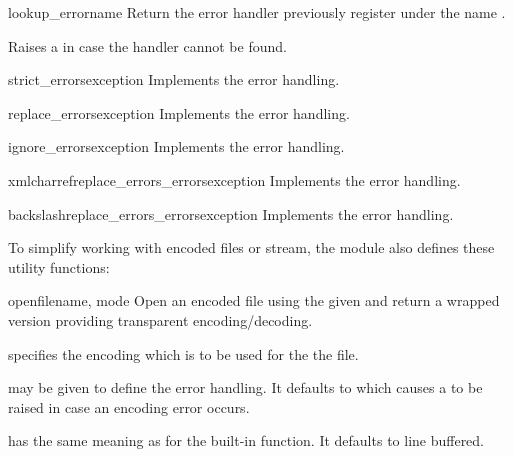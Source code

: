 \begin{funcdesc}{lookup_error}{name}
Return the error handler previously register under the name .

Raises a  in case the handler cannot be found.
\end{funcdesc}

\begin{funcdesc}{strict_errors}{exception}
Implements the  error handling.
\end{funcdesc}

\begin{funcdesc}{replace_errors}{exception}
Implements the  error handling.
\end{funcdesc}

\begin{funcdesc}{ignore_errors}{exception}
Implements the  error handling.
\end{funcdesc}

\begin{funcdesc}{xmlcharrefreplace_errors_errors}{exception}
Implements the  error handling.
\end{funcdesc}

\begin{funcdesc}{backslashreplace_errors_errors}{exception}
Implements the  error handling.
\end{funcdesc}

To simplify working with encoded files or stream, the module
also defines these utility functions:

\begin{funcdesc}{open}{filename, mode}
Open an encoded file using the given  and return
a wrapped version providing transparent encoding/decoding.


 specifies the encoding which is to be used for the
the file.

 may be given to define the error handling. It defaults
to  which causes a  to be raised
in case an encoding error occurs.

 has the same meaning as for the built-in
 function.  It defaults to line buffered.
\end{funcdesc}

